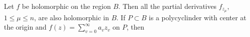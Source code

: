 Let $f$ be holomorphic on the region $B$. Then all the partial derivatives $f_{z_\mu}$, $1 \leqslant \mu \leqslant n$, are also holomorphic in $B$. If $P \subset B$ is a polycyclinder with center at the origin and $f(z) = \sum_{v=0}^{\infty} a_v z_v$ on $P$, then

